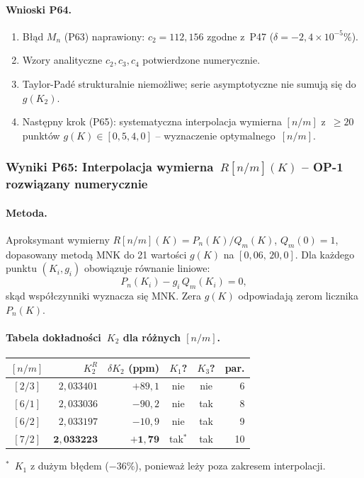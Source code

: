 \paragraph{Wnioski P64.}
\begin{enumerate}
  \item B\l{}\k{a}d $M_n$ (P63) naprawiony: $c_2=112{,}156$ zgodne z~P47 ($\delta=-2{,}4\times10^{-5}\%$).
  \item Wzory analityczne $c_2,c_3,c_4$ potwierdzone numerycznie.
  \item Taylor-Pad\'e strukturalnie niemo\.zliwe; serie asymptotyczne nie sumuj\k{a} si\k{e} do $g(K_2)$.
  \item Nast\k{e}pny krok (P65): systematyczna interpolacja wymierna $[n/m]$
        z~$\geq20$ punkt\'ow $g(K)\in[0{,}5,4{,}0]$ -- wyznaczenie optymalnego~$[n/m]$.
\end{enumerate}

\subsubsection{Wyniki P65: Interpolacja wymierna~$R[n/m](K)$ -- OP-1 rozwi\k{a}zany numerycznie}
\label{app:F-P65}

\paragraph{Metoda.}
Aproksymant wymierny $R[n/m](K) = P_n(K)/Q_m(K)$, $Q_m(0)=1$,
dopasowany metod\k{a} MNK do 21 warto\'sci $g(K)$ na $[0{,}06,\,20{,}0]$.
Dla ka\.zdego punktu $(K_i, g_i)$ obowi\k{a}zuje r\'ownanie liniowe:
\begin{equation}
  P_n(K_i) - g_i\,Q_m(K_i) = 0,
  \label{eq:rat-interp-linear}
\end{equation}
sk\k{a}d wsp\'o\l{}czynniki wyznacza si\k{e} MNK.
Zera $g(K)$ odpowiadaj\k{a} zerom licznika $P_n(K)$.

\paragraph{Tabela dok\l{}adno\'sci~$K_2$ dla r\'o\.znych $[n/m]$.}
\begin{center}
\begin{tabular}{c|rr|cc|r}
\hline
$[n/m]$ & $K_2^{R}$ & $\delta K_2$ (ppm) & $K_1$? & $K_3$? & par. \\
\hline
$[2/3]$ & $2{,}033401$ & $+89{,}1$ & nie & nie & 6 \\
$[6/1]$ & $2{,}033036$ & $-90{,}2$ & nie & tak & 8 \\
$[6/2]$ & $2{,}033197$ & $-10{,}9$ & nie & tak & 9 \\
$[7/2]$ & $\mathbf{2{,}033223}$ & $\mathbf{+1{,}79}$ & tak$^*$ & tak & 10 \\
\hline
\end{tabular}
\end{center}
\footnotesize{$^*$~$K_1$ z du\.zym b\l{}\k{e}dem ($-36\%$), poniewa\.z le\.zy poza zakresem interpolacji.}\normalsize

